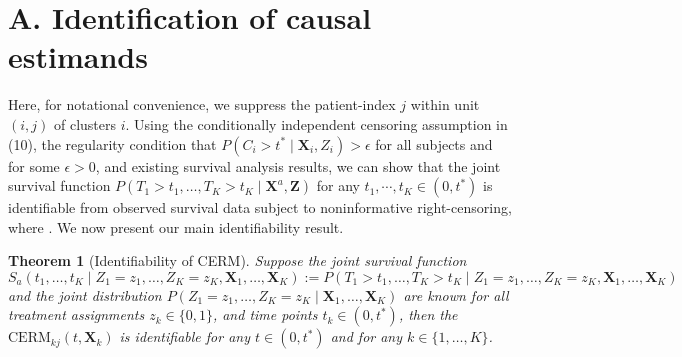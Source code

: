 \documentclass[aoas]{imsart}
\theoremstyle{plain}
\newtheorem{theorem}{Theorem}[section]
\theoremstyle{definition}
\begin{document}
\section*{A. Identification of causal estimands}
Here, for notational convenience, we suppress the patient-index $j$ within unit $(i,j)$ of clusters $i$.
Using the conditionally independent censoring assumption in (10),%
the regularity condition that $P(C_{i} > t^* \mid \mathbf{X}_{i}, Z_{i}) > \epsilon$ for all subjects and for some $\epsilon > 0$, and existing survival analysis results, we can show that the joint survival function
$  
P(T_{1} > t_{1}, \ldots, T_{K} > t_{K} \mid \mathbf{X}^a, \mathbf{Z})
$
for any $t_{1},\cdots, t_K \in (0, t^*)$ is identifiable from observed survival data subject to noninformative right-censoring, where .
\noindent We now present our main identifiability result.

\noindent \begin{theorem}[Identifiability of CERM]
Suppose the joint survival function
$
S_a(t_1, \ldots, t_K \mid Z_1 = z_1, \ldots, Z_K = z_K, \mathbf{X}_1, \ldots, \mathbf{X}_K) := P(T_1 > t_1, \ldots, T_K > t_K \mid Z_1 = z_1, \ldots, Z_K = z_K, \mathbf{X}_1, \ldots, \mathbf{X}_K)
$ and the joint distribution $P(Z_1 = z_1, \ldots, Z_K = z_K \mid \mathbf{X}_1, \ldots, \mathbf{X}_K)$
are known  for all treatment assignments $z_k \in \{0,1\}$, and time points $t_k \in (0, t^*)$, then the $\text{CERM}_{kj}(t, \mathbf{X}_k)$ is identifiable for any $t \in (0, t^*)$ and for any $ k \in \{1,\dots,K\}$.
\end{theorem}
\end{document}
